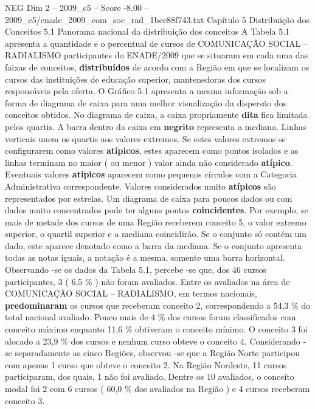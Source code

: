 \begin{textsample}{NEG Dim 2 – 2009\_c5 – Score -8.00 – 2009\_c5/enade\_2009\_com\_soc\_rad\_1bee88f743.txt}  \label{ex:f2_neg_004}
Capítulo 5 Distribuição dos Conceitos 5.1 Panorama nacional da distribuição dos conceitos A Tabela 5.1 apresenta a quantidade e o percentual de cursos de COMUNICAÇÃO SOCIAL – RADIALISMO participantes do ENADE/2009 que se situaram em cada uma das faixas de conceitos, \textbf{distribuídos} de acordo com a Região em que se localizam os cursos das instituições de educação superior, mantenedoras dos cursos responsáveis pela oferta.
O Gráfico 5.1 apresenta a mesma informação sob a forma de diagrama de caixa para uma melhor visualização da dispersão dos conceitos obtidos.
No diagrama de caixa, a caixa propriamente \textbf{dita} fica limitada pelos quartis.
A barra dentro da caixa em \textbf{negrito} representa a mediana.
Linhas verticais unem os quartis aos valores extremos.
Se estes valores extremos se configurarem como valores \textbf{atípicos}, estes aparecem como pontos isolados e as linhas terminam no maior ( ou menor ) valor ainda não considerado \textbf{atípico}.
Eventuais valores \textbf{atípicos} aparecem como pequenos círculos com a Categoria Administrativa correspondente.
Valores considerados muito \textbf{atípicos} são representados por estrelas.
Um diagrama de caixa para poucos dados ou com dados muito concentrados pode ter alguns pontos \textbf{coincidentes}.
Por exemplo, se mais de metade dos cursos de uma Região receberem conceito 5, o valor extremo superior, o quartil superior e a mediana coincidirão.
Se o conjunto só contém um dado, este aparece denotado como a barra da mediana.
Se o conjunto apresenta todas as notas iguais, a notação é a mesma, somente uma barra horizontal.
Observando -se os dados da Tabela 5.1, percebe -se que, dos 46 cursos participantes, 3 ( 6,5 \% ) não foram avaliados.
Entre os avaliados na área de COMUNICAÇÃO SOCIAL – RADIALISMO, em termos nacionais, \textbf{predominaram} os cursos que receberam conceito 2, correspondendo a 54,3 \% do total nacional avaliado.
Pouco mais de 4 \% dos cursos foram classificados com conceito máximo enquanto 11,6 \% obtiveram o conceito mínimo.
O conceito 3 foi alocado a 23,9 \% dos cursos e nenhum curso obteve o conceito 4.
Considerando -se separadamente as cinco Regiões, observou -se que a Região Norte participou com apenas 1 curso que obteve o conceito 2.
Na Região Nordeste, 11 cursos participaram, dos quais, 1 não foi avaliado.
Dentre os 10 avaliados, o conceito modal foi 2 com 6 cursos ( 60,0 \% dos avaliados na Região ) e 4 cursos receberam conceito 3.

\end{textsample}
